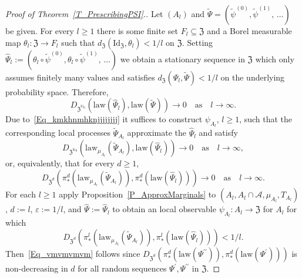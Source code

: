 \documentclass[AHL,Unicode,longabstracts]{cedram}
\newcommand{\clA}{\mathcal{A}}
\newcommand{\law}{\mathrm{law}}
\newcommand{\rmId}{\mathrm{Id}}
\newcommand{\frkZ}{\mathfrak{Z}}
\newcommand{\bbN}{\mathbb{N}}
\begin{document}
\begin{proof}[{Proof of Theorem~\ref{T_PrescribingPSI}.}]
Let $(A_{l})$ and $\widetilde{\Psi}=(\widetilde{\psi}^{(0)},\widetilde{\psi}^{(1)},\,\ldots)$ be given. For every $l\geq1$ there is some finite set $F_{l}\subseteq
\frkZ$ and a Borel measurable map $\theta_{l}:\frkZ\rightarrow F_{l}$ such that $d_{\frkZ}(\rmId_{\frkZ},\theta_{l})<1/l$ on $\frkZ$. Setting $\widehat{\Psi}_{l}:=(\theta_{l}\circ
\widetilde{\psi}^{(0)},\theta_{l}\circ\widetilde{\psi}^{(1)},\,\ldots)$ we obtain a stationary sequence in $\frkZ$ which only assumes finitely many values and satisfies $d_{\frkZ}(\widehat{\Psi}_{l},\widetilde {\Psi})<1/l$ on the underlying probability space. Therefore,
\begin{equation}\label{Eq_kmkhnmhknjjjjjjjj}
D_{\frkZ^{\bbN_{0}}}\left(\law\left(\widehat{\Psi}_{l}\right),\law\left(\widetilde{\Psi}\right)\right)\longrightarrow0 \quad \text{as}\quad l\rightarrow\infty. 
\end{equation}
Due to~\eqref{Eq_kmkhnmhknjjjjjjjj} it suffices to construct $\psi_{A_{l}}$, $l\geq1$, such that the corresponding local processes $\widetilde{\Psi} _{A_{l}}$ approximate the $\widehat{\Psi}_{l}$ and satisfy
\begin{equation}
D_{\frkZ^{\bbN_{0}}}\left(\law_{\mu_{A_{l}}}\left(\widetilde{\Psi }_{A_{l}}\right),\law\left(\widehat{\Psi}_{l}\right)\right)\longrightarrow0\quad \text{as}\quad l\rightarrow\infty,
\end{equation}
or, equivalently, that for every $d\geq1$,
\begin{equation}\label{Eq_vmvmvmvm}
D_{\frkZ^{d}}(\pi_{\ast}^{d}(\law_{\mu_{A_{l}}}(\widetilde {\Psi}_{A_{l}})),\pi_{\ast}^{d}(\law(\widehat{\Psi}_{l})))\longrightarrow0\quad \text{as}\quad l\rightarrow\infty.
\end{equation}
For each $l\geq1$ apply Proposition~\ref{P_ApproxMarginals} to $(A_{l},A_{l}\cap\clA,\mu_{A_{l}},T_{A_{l}})$, $d:=l$, $\varepsilon:=1/l$, and $\widehat{\Psi}:=\widehat{\Psi}_{l}$ to obtain an local observable $\psi_{A_{l}}:A_{l}\rightarrow\frkZ$ for $A_{l}$ for which
\begin{equation}
D_{\frkZ^{d}}\left(\pi_{\ast}^{l}\left(\law_{\mu_{A_{l}}}\left(\widetilde {\Psi}_{A_{l}}\right)\right),\pi_{\ast}^{l}\left(\law\left(\widehat{\Psi}_{l}\right)\right)\right)<1/l.
\end{equation}
Then~\eqref{Eq_vmvmvmvm} follows since $D_{\frkZ^{d}}(\pi_{\ast} ^{d}(\law(\Psi^{\prime\prime})),\pi_{\ast}^{d}(\law (\Psi^{\prime})))$ is non-decreasing in $d$ for all random sequences $\Psi^{\prime},\Psi^{\prime\prime}$ in $\frkZ$.
\end{proof}
\end{document}
